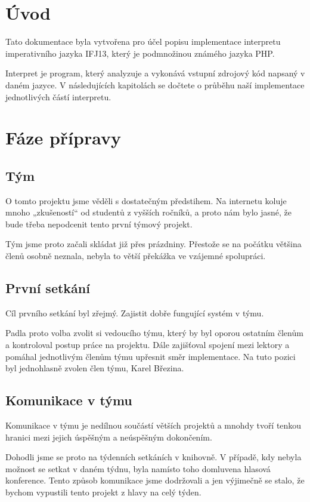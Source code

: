 \documentclass[12pt,a4paper]{article}
\begin{document}
\pagestyle{plain}
\setcounter{page}{1}
\tableofcontents
\newpage
\pagestyle{plain}
\setcounter{page}{1}
\section{Úvod}
Tato dokumentace byla vytvořena pro účel popisu implementace interpretu imperativního jazyka IFJ13, který je podmnožinou známého jazyka PHP. 

Interpret je program, který analyzuje a vykonává vstupní zdrojový kód napsaný v daném jazyce. V následujících kapitolách se dočtete o průběhu naší implementace jednotlivých částí interpretu. 

\newpage
\section{Fáze přípravy}
\subsection{Tým}
O tomto projektu jsme věděli s dostatečným předstihem. Na internetu koluje mnoho „zkušeností“ od studentů z vyšších ročníků, a proto nám bylo jasné, že bude třeba nepodcenit tento první týmový projekt. 

Tým jsme proto začali skládat již přes prázdniny. Přestože se na počátku většina členů osobně neznala, nebyla to větší překážka ve vzájemné spolupráci.


\subsection{První setkání}
Cíl prvního setkání byl zřejmý. Zajistit dobře fungující systém v týmu. 

Padla proto volba zvolit si vedoucího týmu, který by byl oporou ostatním členům a kontroloval postup práce na projektu. 
Dále zajišťoval spojení mezi lektory a pomáhal jednotlivým členům týmu upřesnit směr implementace. Na tuto pozici byl jednohlasně zvolen člen týmu, Karel Březina. 
 

\subsection{Komunikace v týmu}
Komunikace v týmu je nedílnou součástí větších projektů a mnohdy tvoří tenkou hranici mezi jejich úspěšným a neúspěšným dokončením. 

Dohodli jsme se proto na týdenních setkáních v knihovně. V případě, kdy nebyla možnost se setkat v daném týdnu, byla namísto toho domluvena hlasová konference. Tento způsob komunikace jsme dodržovali a jen výjimečně se stalo, že bychom vypustili tento projekt z hlavy na celý týden. 
\end{document}
